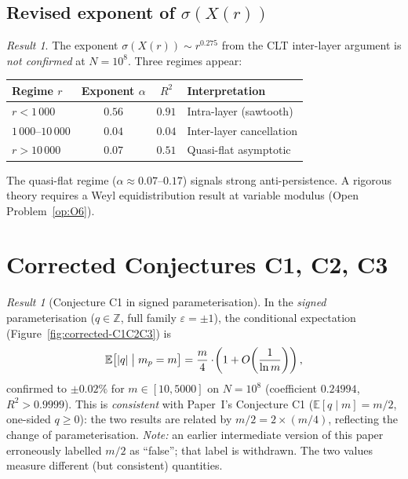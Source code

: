 \documentclass[11pt,a4paper]{article}
\theoremstyle{definition}
\theoremstyle{remark}
\newtheorem{result}[theorem]{Result}
\newcommand{\Z}{\mathbb{Z}}
\newcommand{\E}{\mathbb{E}}
\newcommand{\eps}{\varepsilon}
\begin{document}
\subsection{Revised exponent of $\sigma(X(r))$}

\begin{revisedbox}
\begin{result}\label{res:revised-exponent}
The exponent $\sigma(X(r))\sim r^{0.275}$ from the CLT inter-layer
argument is \emph{not confirmed} at $N=10^{8}$. Three regimes appear:

\smallskip
\centering
\begin{tabular}{@{}lccl@{}}
\toprule
Regime $r$ & Exponent $\alpha$ & $R^{2}$ & Interpretation \\
\midrule
$r<1\,000$ & $0.56$ & $0.91$ & Intra-layer (sawtooth) \\
$1\,000$--$10\,000$ & $0.04$ & $0.04$ & Inter-layer cancellation \\
$r>10\,000$ & $0.07$ & $0.51$ & Quasi-flat asymptotic \\
\bottomrule
\end{tabular}

\smallskip
\flushleft
The quasi-flat regime ($\alpha\approx 0.07$--$0.17$) signals strong
anti-persistence. A rigorous theory requires a Weyl equidistribution
result at variable modulus (Open Problem~\ref{op:O6}).
\end{result}
\end{revisedbox}

\section{Corrected Conjectures C1, C2, C3}\label{sec:corrected}

\begin{heuristicbox}
\begin{result}[Conjecture C1 in signed parameterisation]\label{res:C1}
In the \emph{signed} parameterisation ($q\in\Z$, full family
$\eps=\pm 1$), the conditional expectation
(Figure~\ref{fig:corrected-C1C2C3}) is
\[
  \E\bigl[|q|\bigm|m_{p}=m\bigr]
  =\frac{m}{4}\cdot\!\left(1+O\!\left(\frac{1}{\ln m}\right)\right),
\]
confirmed to $\pm 0.02\%$ for $m\in[10,5000]$ on $N=10^{8}$
(coefficient $0.24994$, $R^{2}>0.9999$). This is \emph{consistent}
with Paper~I's Conjecture C1 ($\E[q\mid m]=m/2$, one-sided
$q\ge 0$): the two results are related by $m/2=2\times(m/4)$,
reflecting the change of parameterisation. \emph{Note:} an earlier
intermediate version of this paper erroneously labelled $m/2$ as
``false''; that label is withdrawn. The two values measure different
(but consistent) quantities.
\end{result}
\end{heuristicbox}
\end{document}
